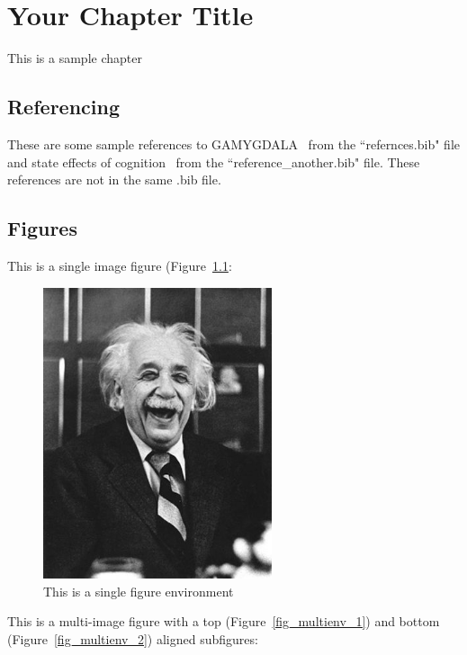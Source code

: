 \chapter{Your Chapter Title}

This is a sample chapter

\section{Referencing}
These are some sample references to GAMYGDALA~ \citep{popescu2014gamygdala} from the ``refernces.bib" file and state effects of cognition~\citep{hudlicka2002time} from the ``reference\_another.bib" file. These references are not in the same .bib file.

\section{Figures}
This is a single image figure (Figure~\ref{fig_singleenv}:

\begin{figure}[ht]
	\centering
	\includegraphics[width=0.6\textwidth]{figures/sample/einstein.jpeg}
	\caption[Single Figure Environment Listed Title]{This is a single figure environment}
	\label{fig_singleenv}
\end{figure}

This is a multi-image figure with a top (Figure~\ref{fig_multienv_1}) and bottom (Figure~\ref{fig_multienv_2}) aligned subfigures:

